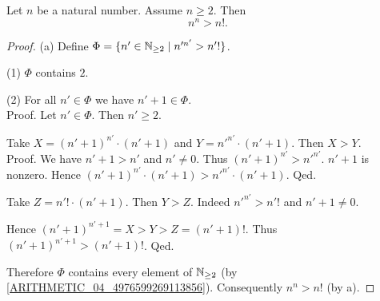 \documentclass[10pt]{article}
\begin{document}
  \begin{forthel}
    \begin{proposition}
      Let $n$ be a natural number.
      Assume $n \geq 2$.
      Then \[ n^{n} > n!. \]
    \end{proposition}
    \begin{proof}
      (a) Define $\Phi = \{ n' \in \mathbb{N}_{\geq 2} \mid n'^{n'} > n'! \}$.
  
      (1) $\Phi$ contains $2$.
  
      (2) For all $n' \in \Phi$ we have $n' + 1 \in \Phi$. \\
      Proof.
        Let $n' \in \Phi$.
        Then $n' \geq 2$.
  
        Take $X = (n' + 1)^{n'} \cdot (n' + 1)$ and $Y = n'^{n'} \cdot (n' + 1)$.
        Then $X > Y$. \\
        Proof.
          We have $n' + 1 > n'$ and $n' \neq 0$.
          Thus $(n' + 1)^{n'} > n'^{n'}$.
          $n' + 1$ is nonzero.
          Hence $(n' + 1)^{n'} \cdot (n' + 1) > n'^{n'} \cdot (n' + 1)$.
        Qed.
  
        Take $Z = n'! \cdot (n' + 1)$.
        Then $Y > Z$.
        Indeed $n'^{n'} > n'!$ and $n' + 1 \neq 0$.
  
        Hence $(n' + 1)^{n' + 1} = X > Y > Z = (n' + 1)!$.
        Thus $(n' + 1)^{n' + 1} > (n' + 1)!$.
      Qed.
  
      Therefore $\Phi$ contains every element of $\mathbb{N}_{\geq 2}$ (by \cref{ARITHMETIC_04_4976599269113856}).
      Consequently $n^{n} > n!$ (by a).
    \end{proof}
  \end{forthel}
\end{document}

